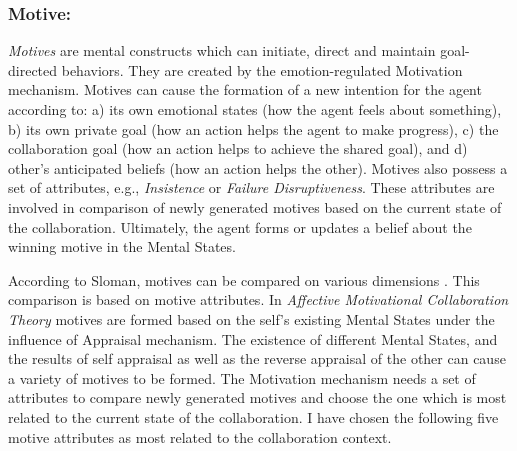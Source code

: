 \documentclass[letterpaper]{article}
\begin{document}
\subsubsection{Motive:}

\textit{Motives} are mental constructs which can initiate, direct and maintain
goal-directed behaviors. They are created by the emotion-regulated Motivation
mechanism. Motives can cause the formation of a new intention for the agent
according to: a) its own emotional states (how the agent feels about something),
b) its own private goal (how an action helps the agent to make progress), c) the
collaboration goal (how an action helps to achieve the shared goal), and d)
other's anticipated beliefs (how an action helps the other). Motives also
possess a set of attributes, e.g., \textit{Insistence} or \textit{Failure
Disruptiveness}. These attributes are involved in comparison of newly generated
motives based on the current state of the collaboration. Ultimately, the agent
forms or updates a belief about the winning motive in the Mental States.

According to Sloman, motives can be compared on various dimensions
\cite{sloman:motivation}. This comparison is based on motive attributes. In
\textit{Affective Motivational Collaboration Theory} motives are formed based on
the self's existing Mental States under the influence of Appraisal mechanism. The
existence of different Mental States, and the results of self appraisal as
well as the reverse appraisal of the other can cause a variety of motives to be
formed. The Motivation mechanism needs a set of attributes to compare newly
generated motives and choose the one which is most related to the current state
of the collaboration. I have chosen the following five motive attributes as
most related to the collaboration context.
\end{document}
